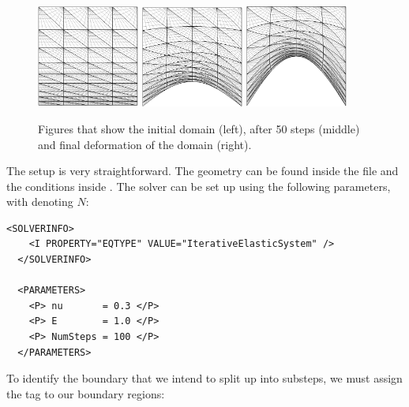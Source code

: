 \begin{figure}
  \begin{center}
    \includegraphics[width=0.3\textwidth]{img/bl-0}
    \includegraphics[width=0.3\textwidth]{img/bl-1}
    \includegraphics[width=0.3\textwidth]{img/bl-2}
  \end{center}
  \caption{Figures that show the initial domain (left), after 50 steps (middle)
    and final deformation of the domain (right).}
  \label{fig:elas:bl}
\end{figure}

The setup is very straightforward. The geometry can be found inside the file
 and the conditions inside
. The solver can be set up using the following
parameters, with  denoting $N$:

\begin{lstlisting}[style=XMLStyle]
  <SOLVERINFO>
    <I PROPERTY="EQTYPE" VALUE="IterativeElasticSystem" />
  </SOLVERINFO>
  
  <PARAMETERS>
    <P> nu       = 0.3 </P>
    <P> E        = 1.0 </P>
    <P> NumSteps = 100 </P>
  </PARAMETERS>
\end{lstlisting}

To identify the boundary that we intend to split up into substeps, we must
assign the  tag to our boundary regions:

